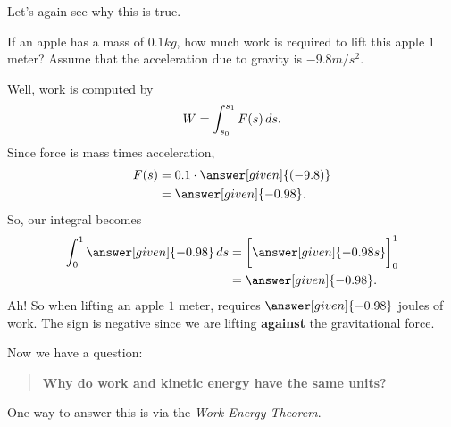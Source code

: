 \documentclass{ximera}
\begin{document}
Let's again see why this is true.
\begin{example}
  If an apple has a mass of $0.1\unit{kg}$, how much work is required
  to lift this apple $1$ meter?  Assume that the acceleration due to
  gravity is $-9.8\unit{m}/\unit{s}^2$.
  \begin{explanation}
    Well, work is computed by
    \[
    W = \int_{s_0}^{s_1} F(s) \,d s.
    \]
    Since force is mass times acceleration,
    \begin{align*}
      F(s) &= 0.1\cdot \answer[given]{(-9.8)} \\
      &= \answer[given]{-0.98}.
    \end{align*}
    So, our integral becomes
    \begin{align*}
      \int_{0}^{1} \answer[given]{-0.98} \d s &= \eval{\answer[given]{-0.98 s}}_0^1\\
      &=\answer[given]{-0.98}.
    \end{align*}
    Ah! So when lifting an apple $1$ meter, requires $\answer[given]{-0.98}$ joules of
    work. The sign is negative since we are lifting \textbf{against}
    the gravitational force.
  \end{explanation}
\end{example}



Now we have a question:
\begin{quote}
 \textbf{Why do work and kinetic energy have the same units?}
\end{quote}

One way to answer this is via the \textit{Work-Energy Theorem}.
\end{document}

